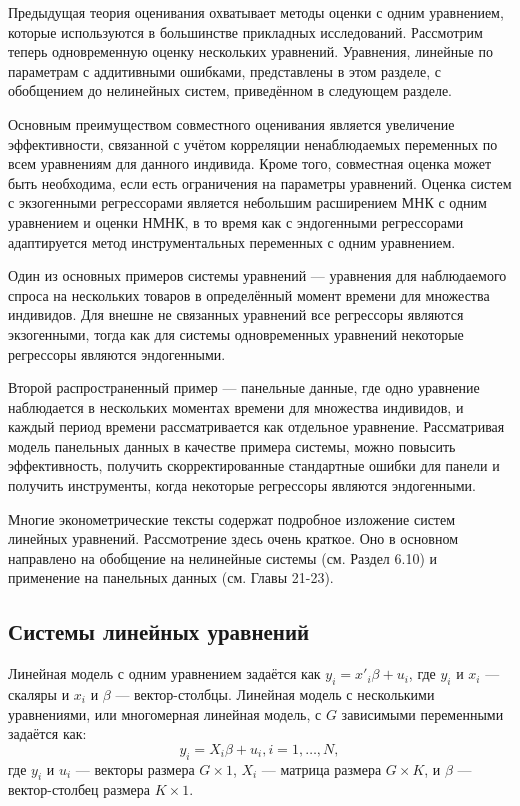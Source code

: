Предыдущая теория оценивания охватывает методы оценки с одним уравнением, которые используются в большинстве прикладных исследований. Рассмотрим теперь одновременную оценку нескольких уравнений. Уравнения, линейные по параметрам с аддитивными ошибками, представлены в этом разделе, с обобщением до нелинейных систем, приведённом в следующем разделе.

Основным преимуществом совместного оценивания является увеличение эффективности,  связанной с учётом корреляции ненаблюдаемых переменных по всем уравнениям для данного индивида. Кроме того, совместная оценка может быть необходима, если есть ограничения на параметры уравнений. Оценка систем с экзогенными регрессорами является небольшим расширением МНК с одним уравнением и оценки НМНК, в то время как с эндогенными регрессорами адаптируется метод инструментальных переменных с одним уравнением.

Один из основных примеров системы уравнений --- уравнения для наблюдаемого спроса на нескольких товаров в определённый момент времени для множества индивидов. Для внешне не связанных уравнений все регрессоры являются экзогенными, тогда как для системы одновременных уравнений некоторые регрессоры являются эндогенными.

Второй распространенный пример --- панельные данные, где одно уравнение наблюдается в нескольких моментах времени для множества индивидов, и каждый период времени рассматривается как отдельное уравнение. Рассматривая модель панельных данных в качестве примера системы, можно повысить эффективность, получить скорректированные стандартные ошибки для панели и получить инструменты, когда некоторые регрессоры являются эндогенными.

Многие эконометрические тексты содержат подробное изложение  систем линейных уравнений. Рассмотрение здесь очень краткое. Оно в основном направлено на обобщение на нелинейные системы (см. Раздел 6.10) и применение на панельных данных (см. Главы 21-23).

\subsection{Системы  линейных уравнений}

Линейная модель с одним уравнением задаётся как $y_i=x'_i\beta+u_i$, где $y_i$ и $x_i$ ---скаляры и $x_i$ и $\beta$ --- вектор-столбцы. Линейная модель с несколькими уравнениями, или многомерная линейная модель, с $G$ зависимыми переменными задаётся как:
\begin{equation}
y_i=X_i \beta + u_i, i=1, \dots, N,
\end{equation}
где $y_i$ и $u_i$ --- векторы размера $G \times 1$, $X_i$ --- матрица размера $G \times K$, и $\beta$ --- вектор-столбец размера $K \times 1$.

